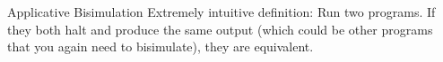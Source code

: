 \documentclass{beamer}
\begin{document}


\begin{frame}{Applicative Bisimulation}
Extremely intuitive definition: Run two programs. If they both halt
and produce the same output (which could be other programs that you
again need to bisimulate), they are equivalent.
\end{frame}
\end{document}
